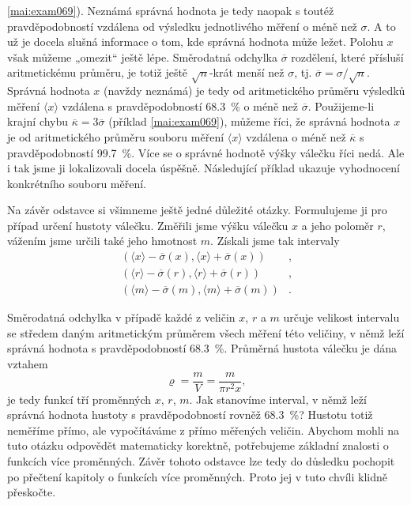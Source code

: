       \ref{mai:exam069}). Neznámá správná hodnota je tedy naopak s toutéž pravděpodobností vzdálena 
      od výsledku jednotlivého měření o méně než \(\sigma\). A to už je docela slušná informace o 
      tom, kde správná hodnota může ležet. Polohu \(x\) však můžeme „omezit“ ještě lépe. Směrodatná 
      odchylka \(\overline{\sigma}\) rozdělení, které přísluší aritmetickému průměru, je
      totiž ještě \(\sqrt{n}\)-krát menší než \(\sigma\), tj. \(\overline{\sigma}= 
      \sigma/\sqrt{n}\). Správná hodnota \(x\) (navždy neznámá) je tedy od aritmetického průměru 
      výsledků měření \(\langle x \rangle\) vzdálena s pravděpodobností \qty{68.3}{\percent} o méně 
      než \(\overline{\sigma}\). Použijeme-li krajní chybu \(\overline{\kappa} = 
      3\overline{\sigma}\) (příklad \ref{mai:exam069}), můžeme říci, že správná hodnota \(x\) je od
      aritmetického průměru souboru měření \(\langle x \rangle\) vzdálena o méně než 
      \(\overline{\kappa}\) s pravděpodobností \qty{99.7}{\percent}. Více se o správné hodnotě výšky 
      válečku říci nedá. Ale i tak jsme ji lokalizovali docela úspěšně. Následující příklad 
      ukazuje vyhodnocení konkrétního souboru měření.

      
      Na závěr odstavce si všimneme ještě jedné důležité otázky. Formulujeme ji pro případ určení
      hustoty válečku. Změřili jsme výšku válečku \(x\) a jeho poloměr \(r\), vážením jsme určili 
      také jeho hmotnost \(m\). Získali jsme tak intervaly
      \begin{align*}
          \left(\langle x \rangle - \overline{\sigma}(x), 
                \langle x \rangle + \overline{\sigma}(x)\right)&,  \\ 
          \left(\langle r \rangle - \overline{\sigma}(r), 
                \langle r \rangle + \overline{\sigma}(r)\right)&,   \\ 
          \left(\langle m \rangle - \overline{\sigma}(m), 
                \langle m \rangle + \overline{\sigma}(m)\right)&. 
      \end{align*}
      
      Směrodatná odchylka v případě každé z veličin \(x\), \(r\) a \(m\) určuje velikost intervalu 
      se středem daným aritmetickým průměrem všech měření této veličiny, v němž leží správná 
      hodnota s pravděpodobností \qty{68.3}{\percent}. Průměrná hustota válečku je dána vztahem
      \begin{equation*}
        \varrho = \dfrac{m}{V} = \dfrac{m}{\pi r^2x},
      \end{equation*}
      je tedy funkcí tří proměnných \(x\), \(r\), \(m\). Jak stanovíme interval, v němž leží 
      správná hodnota hustoty s pravděpodobností rovněž \qty{68.3}{\percent}? Hustotu totiž neměříme 
      přímo, ale vypočítáváme z přímo měřených veličin. Abychom mohli na tuto otázku odpovědět 
      matematicky korektně, potřebujeme základní znalosti o funkcích více proměnných. Závěr tohoto 
      odstavce lze tedy do důsledku pochopit po přečtení kapitoly o funkcích více proměnných. Proto 
      jej v tuto chvíli klidně přeskočte.
      
